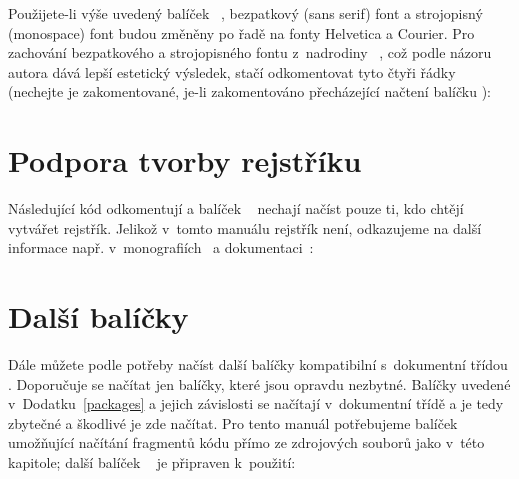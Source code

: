 
\noindent
Použijete-li výše uvedený balíček ~\cite{Ryu:LIVE:CTAN:txfonts},
bezpatkový (sans serif) font a strojopisný (monospace) font budou změněny po
řadě na fonty Helvetica a Courier. Pro zachování bezpatkového a strojopisného
fontu z~nadrodiny ~\cite{Jac:LIVE:CTAN:lm}, což podle názoru autora
dává lepší estetický výsledek, stačí odkomentovat tyto čtyři řádky (nechejte
je zakomentované, je-li zakomentováno přecházející načtení balíčku
):


\section{Podpora tvorby rejstříku}\label{indexsupp}%

Následující kód odkomentují a balíček
~\cite{LtX:LIVE:CTAN:makeidx,%
  Bee:LIVE:CTAN:MakeIndex} nechají načíst pouze ti, kdo chtějí vytvářet
rejstřík. Jelikož v~tomto manuálu rejstřík není, odkazujeme na další informace
např. v~monografiích~\cite{Ryb:2005:LaTeX:3,%
  Kop-Dal:2004:LaTeXPodrPruv:} a dokumentaci~\cite{LtX:LIVE:CTAN:makeidx,%
  Bee:LIVE:CTAN:MakeIndex}:


\section{Další balíčky}\label{otherpack}%

Dále můžete podle potřeby načíst další balíčky kompatibilní s~dokumentní
třídou \pkg{\ipotname}. Doporučuje se načítat jen balíčky, které jsou opravdu
nezbytné. Balíčky uvedené v~Dodatku~\ref{packages} a jejich závislosti se
načítají v~dokumentní třídě a je tedy zbytečné a škodlivé je zde načítat. Pro
tento manuál potřebujeme balíček ~\cite{Vos:LIVE:CTAN:fancyvrb}
umožňující načítání fragmentů kódu přímo ze zdrojových souborů jako v~této
kapitole; další balíček ~\cite{biditex:LIVE:CTAN:subfig} je
připraven k~použití:


